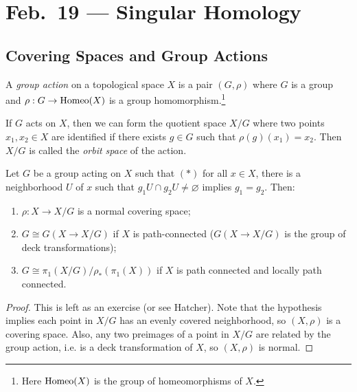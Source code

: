 \chapter{Feb.~19 --- Singular Homology}

\section{Covering Spaces and Group Actions}

\begin{definition}
  A \emph{group action} on a topological space $X$ is
  a pair $(G, \rho)$ where $G$ is a group and
  $\rho : G \to \operatorname{Homeo}(X)$ is a group homomorphism.\footnote{Here $\operatorname{Homeo}(X)$ is the group of homeomorphisms of $X$.}
\end{definition}

\begin{remark}
  If $G$ acts on $X$, then we can form the quotient
  space $X / G$ where two points $x_1, x_2 \in X$ are
  identified if there exists $g \in G$ such that
  $\rho(g)(x_1) = x_2$. Then $X / G$ is called the
  \emph{orbit space} of the action.
\end{remark}

\begin{theorem}
  Let $G$ be a group acting on $X$ such that $(*)$
  for all $x \in X$, there is a neighborhood
  $U$ of $x$ such that $g_1 U \cap g_2 U \ne \varnothing$
  implies $g_1 = g_2$. Then:
  \begin{enumerate}
    \item $\rho : X \to X / G$ is a normal covering
      space;
    \item $G \cong G(X \to X / G)$ if $X$ is
      path-connected ($G(X \to X / G)$ is
      the group of deck transformations);
    \item $G \cong \pi_1(X / G) / \rho_*(\pi_1(X))$
      if $X$ is path connected and locally path
      connected.
  \end{enumerate}
\end{theorem}

\begin{proof}
  This is left as an exercise (or see Hatcher). Note
  that the hypothesis implies each point in
  $X / G$ has an evenly covered neighborhood, so
  $(X, \rho)$ is a covering space. Also, any two
  preimages of a point in $X / G$ are related by the
  group action, i.e. is a deck transformation
  of $X$, so $(X, \rho)$ is normal.
\end{proof}

